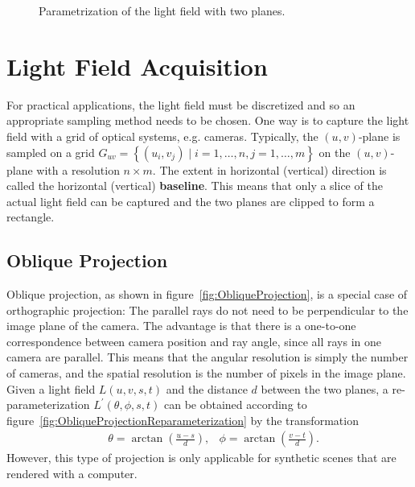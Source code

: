\begin{figure}
	\centering
	
	\caption{Parametrization of the light field with two planes.}
	\label{fig:LightFieldParametrization}
\end{figure}

\section{Light Field Acquisition}

For practical applications, the light field must be discretized and so an appropriate sampling method needs to be chosen.
One way is to capture the light field with a grid of optical systems, e.g. cameras.
Typically, the $(u, v)$-plane is sampled on a grid $G_{uv} = \left \{ \left( u_i, v_j \right) \mid i = 1,\dots, n, j = 1, \dots, m\right \}$ on the $(u, v)$-plane with a resolution $n \times m$.
The extent in horizontal (vertical) direction is called the horizontal (vertical) \textbf{baseline}.
This means that only a slice of the actual light field can be captured and the two planes are clipped to form a rectangle.



\subsection*{Oblique Projection}

Oblique projection, as shown in figure~\ref{fig:ObliqueProjection}, is a special case of orthographic projection: The parallel rays do not need to be perpendicular to the image plane of the camera.
The advantage is that there is a one-to-one correspondence between camera position and ray angle, since all rays in one camera are parallel.
This means that the angular resolution is simply the number of cameras, and the spatial resolution is the number of pixels in the image plane.
Given a light field $L(u, v, s, t)$ and the distance $d$ between the two planes, a re-parameterization $L^{\prime}(\theta, \phi, s, t)$ can be obtained according to figure~\ref{fig:ObliqueProjectionReparameterization} by the transformation
\begin{align*}
		& \theta = \arctan\left(\frac{u - s}{d}\right), & \phi = \arctan\left(\frac{v - t}{d}\right).
\end{align*}
However, this type of projection is only applicable for synthetic scenes that are rendered with a computer.

